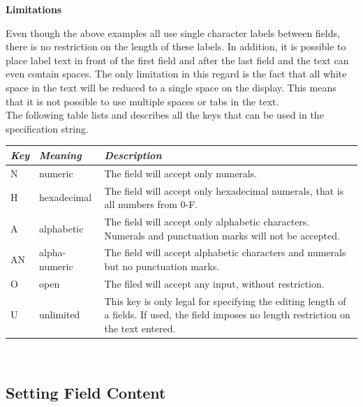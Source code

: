 \begin{center}
\end{center}

\textbf{Limitations}

Even though the above examples all use single character labels between
fields, there is no restriction on the length of these labels. In
addition, it is possible to place label text in front of the first field
and after the last field and the text can even contain spaces. The only
limitation in this regard is the fact that all white space in the text
will be reduced to a single space on the display. This means that it is
not possible to use multiple spaces or tabs in the text.\\

The following table lists and describes all the keys that can be used in
the specification string.\\

\begin{center}
\begin{tabularx}{\textwidth}{|l|l|X|}
\hline \textit{Key} & \textit{Meaning} & \textit{Description} \\
\hline N & numeric & The field will accept only numerals.\\
\hline H & hexadecimal & The field will accept only hexadecimal numerals, that is all numbers from 0-F.\\
\hline A & alphabetic & The field will accept only alphabetic characters. Numerals and punctuation marks will not be accepted.\\
\hline AN & alpha-numeric & The field will accept alphabetic characters and numerals but no punctuation marks.\\
\hline O & open & The filed will accept any input, without restriction.\\
\hline U & unlimited & This key is only legal for specifying the editing length of a fields. If used, the field imposes no length restriction on the text entered.\\
\hline
\end{tabularx}\
\end{center}

\subsection{Setting Field Content}


